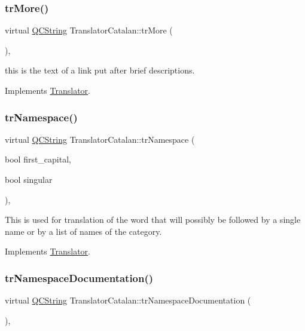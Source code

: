 \subsubsection{\texorpdfstring{trMore()}{trMore()}}
{\footnotesize\ttfamily virtual \mbox{\hyperlink{class_q_c_string}{Q\+C\+String}} Translator\+Catalan\+::tr\+More (\begin{DoxyParamCaption}{ }\end{DoxyParamCaption})\hspace{0.3cm}{\ttfamily [inline]}, {\ttfamily [virtual]}}

this is the text of a link put after brief descriptions. 

Implements \mbox{\hyperlink{class_translator}{Translator}}.

\mbox{\label{class_translator_catalan_afcaeafc92361d19832b3c97194e43e43}} 
\subsubsection{\texorpdfstring{trNamespace()}{trNamespace()}}
{\footnotesize\ttfamily virtual \mbox{\hyperlink{class_q_c_string}{Q\+C\+String}} Translator\+Catalan\+::tr\+Namespace (\begin{DoxyParamCaption}\item[{bool}]{first\+\_\+capital,  }\item[{bool}]{singular }\end{DoxyParamCaption})\hspace{0.3cm}{\ttfamily [inline]}, {\ttfamily [virtual]}}

This is used for translation of the word that will possibly be followed by a single name or by a list of names of the category. 

Implements \mbox{\hyperlink{class_translator}{Translator}}.

\mbox{\label{class_translator_catalan_ad6d5cae08b8a3f781875516ee534b9cc}} 
\subsubsection{\texorpdfstring{trNamespaceDocumentation()}{trNamespaceDocumentation()}}
{\footnotesize\ttfamily virtual \mbox{\hyperlink{class_q_c_string}{Q\+C\+String}} Translator\+Catalan\+::tr\+Namespace\+Documentation (\begin{DoxyParamCaption}{ }\end{DoxyParamCaption})\hspace{0.3cm}{\ttfamily [inline]}, {\ttfamily [virtual]}}

